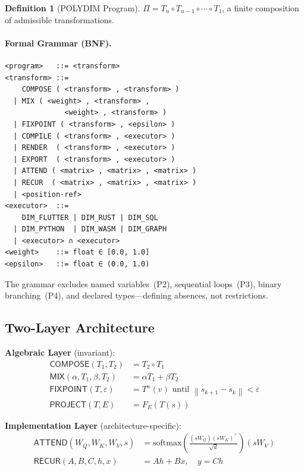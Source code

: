 \documentclass[10pt,twocolumn]{article}
\theoremstyle{plain}
\theoremstyle{definition}
\newtheorem{definition}[theorem]{Definition}
\theoremstyle{remark}
\newcommand{\Compose}{\mathsf{COMPOSE}}
\newcommand{\Mix}{\mathsf{MIX}}
\newcommand{\Fixpoint}{\mathsf{FIXPOINT}}
\newcommand{\Project}{\mathsf{PROJECT}}
\newcommand{\Attend}{\mathsf{ATTEND}}
\newcommand{\Recur}{\mathsf{RECUR}}
\newcommand{\norm}[1]{\left\|#1\right\|}
\begin{document}
\begin{definition}[POLYDIM Program]
$\Pi = T_n \circ T_{n-1} \circ \cdots \circ T_1$, a finite composition of
admissible transformations.
\end{definition}

\paragraph{Formal Grammar (BNF).}

\begin{lstlisting}[language=polydim,caption={Abstract BNF grammar of POLYDIM.}]
<program>   ::= <transform>
<transform> ::=
    COMPOSE ( <transform> , <transform> )
  | MIX ( <weight> , <transform> ,
              <weight> , <transform> )
  | FIXPOINT ( <transform> , <epsilon> )
  | COMPILE ( <transform> , <executor> )
  | RENDER  ( <transform> , <executor> )
  | EXPORT  ( <transform> , <executor> )
  | ATTEND ( <matrix> , <matrix> , <matrix> )
  | RECUR  ( <matrix> , <matrix> , <matrix> )
  | <position-ref>
<executor>  ::=
    DIM_FLUTTER | DIM_RUST | DIM_SQL
  | DIM_PYTHON  | DIM_WASM | DIM_GRAPH
  | <executor> ∩ <executor>
<weight>    ::= float ∈ [0.0, 1.0]
<epsilon>   ::= float ∈ (0.0, 1.0)
\end{lstlisting}

The grammar excludes named variables~(P2), sequential loops~(P3), binary
branching~(P4), and declared types---defining absences, not restrictions.

\subsection{Two-Layer Architecture}

\textbf{Algebraic Layer} (invariant):
\begin{align*}
\Compose(T_1, T_2)      &= T_2 \circ T_1 \\
\Mix(\alpha, T_1, \beta, T_2) &= \alpha T_1 + \beta T_2 \\
\Fixpoint(T, \varepsilon) &= T^n(v) \text{ until } \norm{s_{k+1} - s_k} < \varepsilon \\
\Project(T, E)           &= F_E(T(s))
\end{align*}

\textbf{Implementation Layer} (architecture-specific):
\begin{align*}
\Attend(W_Q, W_K, W_V, s) &= \mathrm{softmax}\!\left(\tfrac{(sW_Q)(sW_K)^\top}{\sqrt{d}}\right)(sW_V) \\
\Recur(A, B, C, h, x)    &= Ah + Bx,\quad y = Ch
\end{align*}
\end{document}

